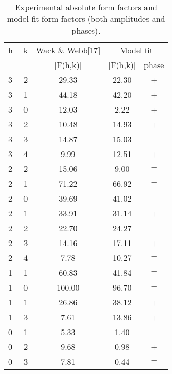 \pagebreak

\begin{table}
\caption{Experimental absolute form factors and model
fit form factors (both amplitudes \hspace{1in} and phases).
\label{formfactor}}
\vspace{6pt}
{\tabcolsep=0.2in
\begin{tabular}{lrccc} 
h & k & Wack \& Webb[17] &
	\multicolumn{2}{c}{Model fit} \\ \cline{4-5}
& & $|$F(h,k)$|$ & $|$F(h,k)$|$ & phase \\ \hline
3  &     -2   &           29.33   &        22.30   &        + \\
3  &     -1   &           44.18   &        42.20   &        + \\
3  &      0   &           12.03   &         2.22   &        + \\
3  &      2   &           10.48   &        14.93   &        + \\
3  &      3   &           14.87   &        15.03   &        $-$ \\
3  &      4   &            9.99   &        12.51   &        + \\
2  &     -2   &           15.06   &         9.00    &       $-$ \\
2   &    -1  &            71.22   &        66.92    &       $-$ \\
2   &     0    &          39.69   &        41.02   &        $-$ \\
2  &      1     &         33.91 &          31.14   &        + \\
2  &      2    &          22.70   &        24.27    &       $-$ \\
2    &    3     &         14.16    &       17.11    &       + \\
2   &     4     &          7.78    &       10.27     &      $-$ \\
1    &   -1       &       60.83    &       41.84      &     $-$ \\
1  &      0     &        100.00    &       96.70   &        $-$ \\
1  &      1       &       26.86         &  38.12       &    + \\
1   &     3        &       7.61        &   13.86        &   + \\
0    &    1         &      5.33          &  1.40         &  $-$ \\
0     &   2          &     9.68          &  0.98        &   + \\
0      &  3           &    7.81         &   0.44         &  $-$ \\
\end{tabular}
}
\end{table}

